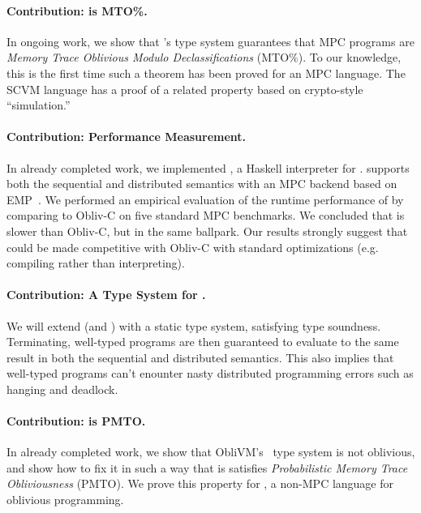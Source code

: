 \paragraph{Contribution: \mpc is MTO\%.} In ongoing work, we show that \mpc's type system guarantees that MPC programs are
\emph{Memory Trace Oblivious Modulo Declassifications} (MTO\%). To our knowledge, this is the first time such a theorem has been
proved for an MPC language. The SCVM language  has a proof of a related property based on crypto-style ``simulation.''

\paragraph{Contribution: \mpc Performance Measurement.} In already completed work, we implemented \system, a Haskell
interpreter for \mpc. \system supports both the sequential and distributed semantics with an MPC backend based on EMP~\cite{todo}.
We performed an empirical evaluation of the runtime performance of \system by comparing to Obliv-C on five standard MPC benchmarks. We concluded
that \system is slower than Obliv-C, but in the same ballpark. Our results strongly suggest that \system could be made competitive with Obliv-C
with standard optimizations (e.g. compiling rather than interpreting).

\paragraph{Contribution: A Type System for \mpc.} We will extend \mpc (and \system) with a static type system, satisfying type soundness.
Terminating, well-typed programs are then guaranteed to evaluate to the same result in both the sequential and distributed semantics.
This also implies that well-typed programs can't enounter nasty distributed programming errors such as hanging and deadlock.

\paragraph{Contribution: \obliv is PMTO.} In already completed work, we show that ObliVM's~\cite{todo} type system is not oblivious,
and show how to fix it in such a way that is satisfies \emph{Probabilistic Memory Trace Obliviousness} (PMTO).
We prove this property for \obliv, a non-MPC language for oblivious programming.

